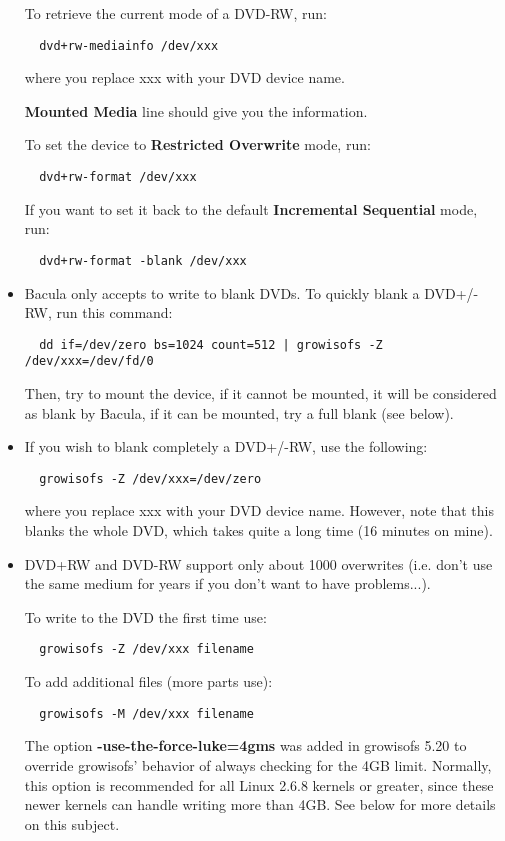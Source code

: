 \begin{itemize}
  To retrieve the current mode of a DVD-RW, run:
\begin{verbatim}
  dvd+rw-mediainfo /dev/xxx
\end{verbatim}
  where you replace xxx with your DVD device name.

  {\bf Mounted Media} line should give you the information.

  To set the device to {\bf Restricted Overwrite} mode, run:
\begin{verbatim}
  dvd+rw-format /dev/xxx
\end{verbatim}
  If you want to set it back to the default {\bf Incremental Sequential} mode, run:
\begin{verbatim}
  dvd+rw-format -blank /dev/xxx
\end{verbatim}

\item Bacula only accepts to write to blank DVDs. To quickly blank a DVD+/-RW, run
  this command:
\begin{verbatim}
  dd if=/dev/zero bs=1024 count=512 | growisofs -Z /dev/xxx=/dev/fd/0
\end{verbatim}
  Then, try to mount the device, if it cannot be mounted, it will be considered
  as blank by Bacula, if it can be mounted, try a full blank (see below).

\item If you wish to blank completely a DVD+/-RW, use the following:
\begin{verbatim}
  growisofs -Z /dev/xxx=/dev/zero
\end{verbatim}
  where you replace xxx with your DVD device name. However, note that this
  blanks the whole DVD, which takes quite a long time (16 minutes on mine).
\item DVD+RW and DVD-RW support only about 1000 overwrites (i.e. don't use the
same medium for years if you don't want to have problems...).

To write to the DVD the first time use:
\begin{verbatim}
  growisofs -Z /dev/xxx filename
\end{verbatim}

To add additional files (more parts use):

\begin{verbatim}
  growisofs -M /dev/xxx filename
\end{verbatim}

The option {\bf -use-the-force-luke=4gms} was added in growisofs 5.20 to
override growisofs' behavior of always checking for the 4GB limit.
Normally, this option is recommended for all Linux 2.6.8 kernels or
greater, since these newer kernels can handle writing more than 4GB.
See below for more details on this subject.


\end{itemize}
